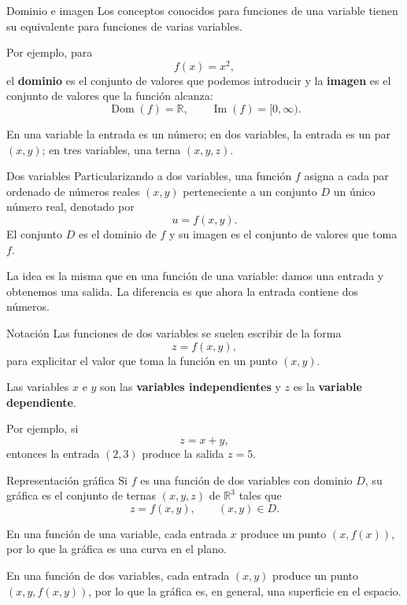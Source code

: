 \begin{frame}{Dominio e imagen}
Los conceptos conocidos para funciones de una variable tienen su equivalente para funciones de varias variables.
\medskip

Por ejemplo, para
\[
f(x)=x^2,
\]
el \textbf{dominio} es el conjunto de valores que podemos introducir y la \textbf{imagen} es el conjunto de valores que la función alcanza:
\[
\operatorname{Dom}(f)=\mathbb{R},
\qquad
\operatorname{Im}(f)=[0,\infty).
\]
\medskip

En una variable la entrada es un número; en dos variables, la entrada es un par $(x,y)$; en tres variables, una terna $(x,y,z)$.
\end{frame}

\begin{frame}{Dos variables}
Particularizando a dos variables, una función $f$ asigna a cada par ordenado de números reales $(x,y)$ perteneciente a un conjunto $D$ un único número real, denotado por
\[
u=f(x,y).
\]
El conjunto $D$ es el dominio de $f$ y su imagen es el conjunto de valores que toma $f$.
\medskip

La idea es la misma que en una función de una variable: damos una entrada y obtenemos una salida. La diferencia es que ahora la entrada contiene dos números.
\end{frame}

\begin{frame}{Notación}
Las funciones de dos variables se suelen escribir de la forma
\[
z=f(x,y),
\]
para explicitar el valor que toma la función en un punto $(x,y)$.
\medskip

Las variables $x$ e $y$ son las \textbf{variables independientes} y $z$ es la \textbf{variable dependiente}.
\medskip

Por ejemplo, si
\[
z=x+y,
\]
entonces la entrada $(2,3)$ produce la salida $z=5$.
\end{frame}

\begin{frame}{Representación gráfica}
\small
Si $f$ es una función de dos variables con dominio $D$, su gráfica es el conjunto de ternas $(x,y,z)$ de $\mathbb{R}^3$ tales que
\[
z=f(x,y),\qquad (x,y)\in D.
\]
\medskip

En una función de una variable, cada entrada $x$ produce un punto $(x,f(x))$, por lo que la gráfica es una curva en el plano.
\medskip

En una función de dos variables, cada entrada $(x,y)$ produce un punto $(x,y,f(x,y))$, por lo que la gráfica es, en general, una superficie en el espacio.
\end{frame}

